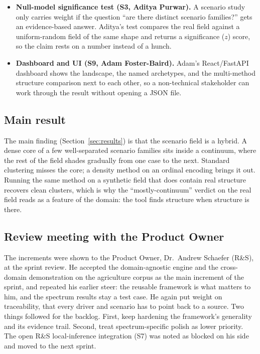 \documentclass[11pt,a4paper]{article}
\begin{document}
\begin{itemize}
  robotics produced a coherent analysis with no code changes.
  \item \textbf{Null-model significance test (S3, Aditya Purwar).} A scenario study only carries weight if
  the question \enquote{are there distinct scenario families?} gets an evidence-based answer. Aditya's test
  compares the real field against a uniform-random field of the same shape and returns a significance ($z$)
  score, so the claim rests on a number instead of a hunch.
  \item \textbf{Dashboard and UI (S9, Adam Foster-Baird).} Adam's React/FastAPI dashboard shows the
  landscape, the named archetypes, and the multi-method structure comparison next to each other, so a
  non-technical stakeholder can work through the result without opening a JSON file.
\end{itemize}

\subsection*{Main result}
The main finding (Section~\ref{sec:results}) is that the scenario field is a hybrid. A dense core of a few
well-separated scenario families sits inside a continuum, where the rest of the field shades gradually from
one case to the next. Standard clustering misses the core; a density method on an ordinal encoding brings it
out. Running the same method on a synthetic field that does contain real structure recovers clean clusters,
which is why the \enquote{mostly-continuum} verdict on the real field reads as a feature of the domain: the
tool finds structure when structure is there.

\subsection*{Review meeting with the Product Owner}
The increments were shown to the Product Owner, Dr.\ Andrew Schaefer (R\&S), at the sprint review. He
accepted the domain-agnostic engine and the cross-domain demonstration on the agriculture corpus as the main
increment of the sprint, and repeated his earlier steer: the reusable framework is what matters to him, and
the spectrum results stay a test case. He again put weight on traceability, that every driver and scenario
has to point back to a source. Two things followed for the backlog. First, keep hardening the framework's
generality and its evidence trail. Second, treat spectrum-specific polish as lower priority. The open R\&S
local-inference integration (S7) was noted as blocked on his side and moved to the next sprint.
\end{document}

